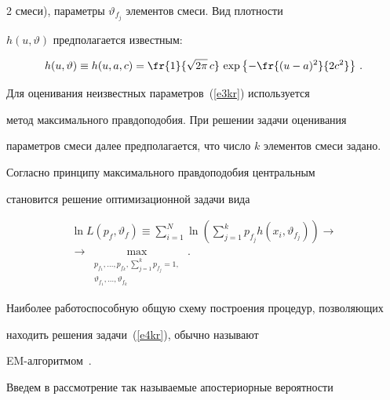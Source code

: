 \begin{multicols}{2}
смеси), параметры $\vartheta_{f_j}$ элементов смеси. Вид плотности 


     $h(u,\vartheta )$ предполагается известным: 


     $$


     h(u,\vartheta ) \equiv h(u,a,c)=\fr{1}{\sqrt{2\pi}\,c}\,\exp\left \{ -\fr{(u-


a)^2}{2c^2}\right \}\,.


     $$


     


     Для оценивания неизвестных параметров~(\ref{e3kr}) используется 


метод максимального правдоподобия. При решении задачи оценивания 


параметров смеси далее предполагается, что число $k$ элементов смеси задано.


     


     Согласно принципу максимального правдоподобия центральным 


становится решение оптимизационной задачи вида


     \begin{multline}


     \ln L(p_f,\vartheta_f )\equiv  \sum\limits_{i=1}^N \ln \left (


     \sum\limits_{j=1}^k p_{f_j}h\left ( x_i,\vartheta_{f_j}\right )\right )\rightarrow{}\\


     {}\rightarrow


     \underset{\substack{{p_{f_1},\ldots , p_{f_k}, \sum\limits_{j=1}^k p_{f_j} 


=1,}\\{\vartheta_{f_1},\ldots , \vartheta_{f_k}} }}{\max}\,.


     \label{e4kr}


     \end{multline}





Наиболее работоспособную общую схему построения процедур, позволяющих 


находить решения задачи~(\ref{e4kr}), обычно называют 


EM-ал\-го\-рит\-мом~\cite{2kr}.





     Введем в рассмотрение так называемые апостериорные вероятности 



\end{multicols}
